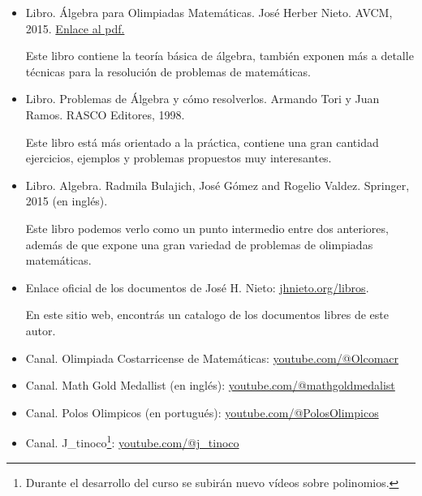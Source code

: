 \begin{itemize}
    \item Libro. Álgebra para Olimpiadas Matemáticas. José Herber Nieto. AVCM, 2015. \href{https://acmfiles.s3.amazonaws.com/Libros/AlgebraParaOlimpiadas.pdf}{Enlace al pdf.}

    Este libro contiene la teoría básica de álgebra, también exponen más a detalle técnicas para la resolución de problemas de matemáticas.
    \item Libro. Problemas de Álgebra y cómo resolverlos. Armando Tori y Juan Ramos. RASCO Editores, 1998.

    Este libro está más orientado a la práctica, contiene una gran cantidad ejercicios, ejemplos y problemas propuestos muy interesantes.
    \item Libro. Algebra. Radmila Bulajich, José Gómez and Rogelio Valdez. Springer, 2015 (en inglés).

    Este libro podemos verlo como un punto intermedio entre dos anteriores, además de que expone una gran variedad de problemas de olimpiadas matemáticas.
    \item Enlace oficial de los documentos de José H. Nieto: \href{https://www.jhnieto.org/libros.htm}{jhnieto.org/libros}.

    En este sitio web, encontrás un catalogo de los documentos libres de este autor.
    \item Canal. Olimpiada Costarricense de Matemáticas: \href{https://www.youtube.com/@Olcomacr}{youtube.com/@Olcomacr}
    \item Canal. Math Gold Medallist (en inglés): \href{https://www.youtube.com/@mathgoldmedalist}{youtube.com/@mathgoldmedalist}
    \item Canal. Polos Olimpicos (en portugués): \href{https://www.youtube.com/@PolosOlimpicos}{youtube.com/@PolosOlimpicos}
    \item Canal. J\_tinoco\footnote{Durante el desarrollo del curso se subirán nuevo vídeos sobre polinomios.}: \href{https://www.youtube.com/channel/UCXFWu2nZqMJ5hEJS37Uf3cA}{youtube.com/@j\_tinoco}
\end{itemize}
